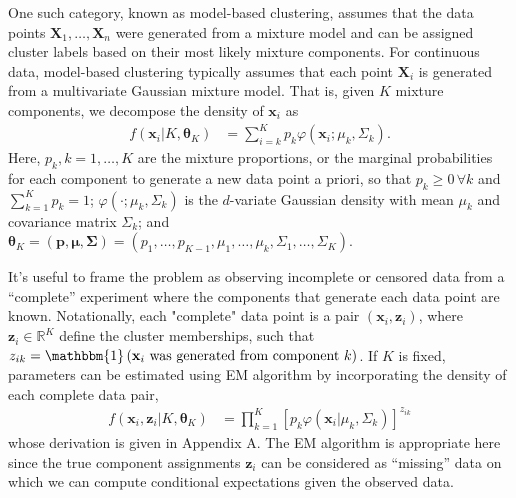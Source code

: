 \documentclass{uwstat572}
\newcommand*\reals{\mathbb{R}}
\newcommand*\ba{\[ \begin{aligned}}
\newcommand*\ea{\end{aligned} \]}
\newcommand*\ind[1]{\mathbbm{1}\left(#1\right)}
\newcommand*\bp{\mathbf{p}}
\newcommand*\bx{\mathbf{x}}
\newcommand*\bX{\mathbf{X}}
\newcommand*\bz{\mathbf{z}}
\newcommand*\btheta{\boldsymbol{\theta}}
\newcommand*\bmu{\boldsymbol{\mu}}
\newcommand*\bSigma{\boldsymbol{\Sigma}}
\renewcommand\;{\,}
\renewcommand\phi{\varphi}
\begin{document}
One such category, known as model-based clustering, assumes that the data points 
$\bX_1, \dotsc, \bX_n$ were generated from a mixture model and can be assigned cluster labels based on their most likely mixture components.
For continuous data, model-based clustering typically assumes that each point $\bX_i$ is generated from a multivariate Gaussian mixture model. 
That is, given $K$ mixture components, we decompose the density of $\bx_i$ as
\ba
f(\bx_i | K, \btheta_K)
	& = \sum_{i=k}^K p_k \phi \left(\bx_i ; \mu_k, \Sigma_k \right).
\ea
Here, $p_k, k = 1, \dotsc, K$ are the mixture proportions, or the marginal probabilities for each component to generate a new data point a priori, so that $p_k \ge 0 \; \forall k$ and $\sum_{k=1}^K p_k = 1$; $\phi(\cdot; \mu_k, \Sigma_k)$ is the $d$-variate Gaussian density with mean $\mu_k$ and covariance matrix $\Sigma_k$; and $\btheta_K = (\bp, \bmu, \bSigma) = (p_1, \dotsc, p_{K - 1}, \mu_1, \dotsc, \mu_k, \Sigma_1, \dotsc, \Sigma_K)$.

It's useful to frame the problem as observing incomplete or censored data from a ``complete'' experiment where the components that generate each data point are known. Notationally, each "complete" data point is a pair $(\bx_i, \bz_i)$, where 
$\bz_i \in \reals^K$ define the cluster memberships, such that $z_{ik} = \ind{\bx_i \text{ was generated from component $k$}}$.  
If $K$ is fixed, parameters can be estimated using EM algorithm by incorporating the density of each complete data pair,
\ba
f(\bx_i, \bz_i | K, \btheta_K)
	& = \prod_{k=1}^K \left[ p_k \phi(\bx_i | \mu_k, \Sigma_k) \right]^{z_{ik}}
\ea
whose derivation is given in Appendix A.
The EM algorithm is appropriate here since the true component assignments $\bz_i$ can be considered as ``missing'' data on which we can compute conditional expectations given the observed data.
\end{document}
